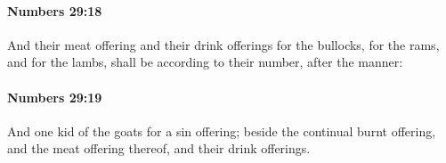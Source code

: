 		\paragraph{Numbers 29:18} %
			\label{NUMBERS-29-18}

			And their meat offering and their drink offerings for the bullocks, for the rams, and for the lambs, shall be according to their number, after the manner:


		\paragraph{Numbers 29:19} %
			\label{NUMBERS-29-19}

			And one kid of the goats for a sin offering; beside the continual burnt offering, and the meat offering thereof, and their drink offerings.


